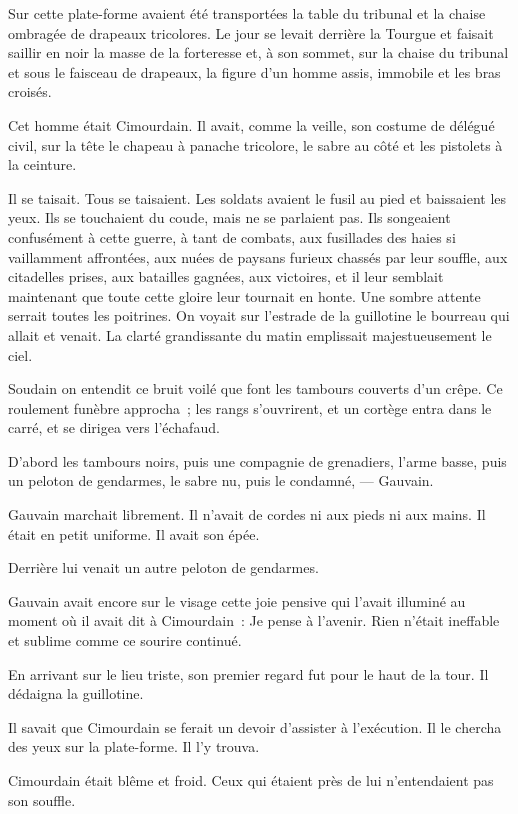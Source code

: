 \documentclass[french,twoside]{book} %
\begin{document}
Sur cette plate-forme avaient été transportées la table du tribunal et la chaise ombragée de drapeaux tricolores. Le jour se levait derrière la Tourgue et faisait saillir en noir la masse de la forteresse et, à son sommet, sur la chaise du tribunal et sous le faisceau de drapeaux, la figure d’un homme assis, immobile et les bras croisés.\par
Cet homme était Cimourdain. Il avait, comme la veille, son costume de délégué civil, sur la tête le chapeau à panache tricolore, le sabre au côté et les pistolets à la ceinture.\par
 Il se taisait. Tous se taisaient. Les soldats avaient le fusil au pied et baissaient les yeux. Ils se touchaient du coude, mais ne se parlaient pas. Ils songeaient confusément à cette guerre, à tant de combats, aux fusillades des haies si vaillamment affrontées, aux nuées de paysans furieux chassés par leur souffle, aux citadelles prises, aux batailles gagnées, aux victoires, et il leur semblait maintenant que toute cette gloire leur tournait en honte. Une sombre attente serrait toutes les poitrines. On voyait sur l’estrade de la guillotine le bourreau qui allait et venait. La clarté grandissante du matin emplissait majestueusement le ciel.\par
Soudain on entendit ce bruit voilé que font les tambours couverts d’un crêpe. Ce roulement funèbre approcha ; les rangs s’ouvrirent, et un cortège entra dans le carré, et se dirigea vers l’échafaud.\par
D’abord les tambours noirs, puis une compagnie de grenadiers, l’arme basse, puis un peloton de gendarmes, le sabre nu, puis le condamné, — Gauvain.\par
Gauvain marchait librement. Il n’avait de cordes ni aux pieds ni aux mains. Il était en petit uniforme. Il avait son épée.\par
Derrière lui venait un autre peloton de gendarmes.\par
Gauvain avait encore sur le visage cette joie pensive qui l’avait illuminé au moment où il avait dit à Cimourdain : Je pense à l’avenir. Rien n’était ineffable et sublime comme ce sourire continué.\par
En arrivant sur le lieu triste, son premier regard fut pour le haut de la tour. Il dédaigna la guillotine.\par
Il savait que Cimourdain se ferait un devoir  d’assister à l’exécution. Il le chercha des yeux sur la plate-forme. Il l’y trouva.\par
Cimourdain était blême et froid. Ceux qui étaient près de lui n’entendaient pas son souffle.\par
\end{document}
